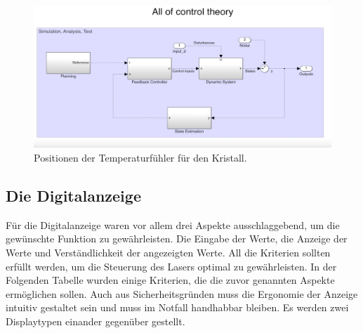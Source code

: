 \begin{figure}[H]
    \centering
    \includegraphics[scale=0.2]{98_images/all_control_theory.PNG}
    \caption{Positionen der Temperaturfühler für den Kristall.}
    \label{fig:temp_measurement_hw}
\end{figure}
% 

\subsection{Die Digitalanzeige}
Für die Digitalanzeige waren vor allem drei Aspekte ausschlaggebend, um die gewünschte Funktion zu gewährleisten. Die Eingabe der Werte, die Anzeige der Werte und Verständlichkeit der angezeigten Werte. All die Kriterien sollten erfüllt werden, um die Steuerung des Lasers optimal zu gewährleisten. In der Folgenden Tabelle wurden einige Kriterien, die die zuvor genannten Aspekte ermöglichen sollen. Auch aus Sicherheitsgründen muss die Ergonomie der Anzeige intuitiv gestaltet sein und muss im Notfall handhabbar bleiben. Es werden zwei Displaytypen einander gegenüber gestellt.

